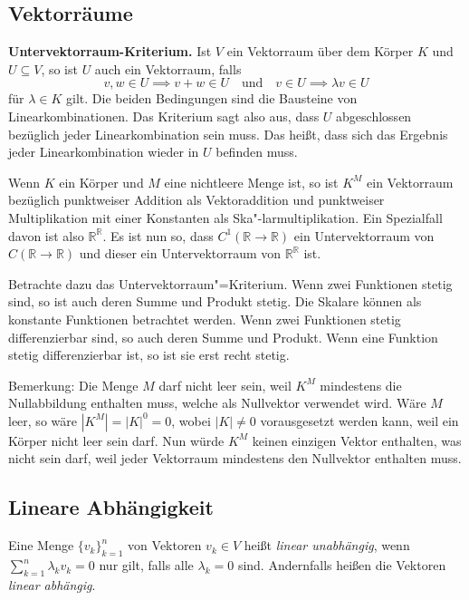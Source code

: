 \documentclass[a4paper,11pt,fleqn,twoside]{scrartcl}
\numberwithin{equation}{section}
\newcommand{\R}{\mathbb R}
\newcommand{\strong}[1]{{\sf\bfseries #1}}
\newenvironment{Definition}{\strong{Definition.}}{\par}
\begin{document}
\subsection{Vektorräume}
\strong{Untervektorraum-Kriterium.}
Ist $V$ ein Vektorraum über
dem Körper $K$ und $U\subseteq V$, so ist $U$ auch ein Vektorraum,
falls
\begin{equation}
v,w\in U\implies v+w\in U
\quad\text{und}\quad
v\in U\implies \lambda v\in U
\end{equation}
für $\lambda\in K$ gilt. Die beiden Bedingungen sind die Bausteine von
Linearkombinationen. Das Kriterium sagt also aus, dass $U$
abgeschlossen bezüglich jeder Linearkombination sein muss.
Das heißt, dass sich das Ergebnis jeder Linearkombination wieder
in $U$ befinden muss.

Wenn $K$ ein Körper und
$M$ eine nichtleere Menge ist, so ist $K^M$ ein Vektorraum bezüglich
punktweiser Addition als Vektoraddition und punktweiser Multiplikation
mit einer Konstanten als Ska"-larmultiplikation. Ein Spezialfall davon
ist also $\R^\R$. Es ist nun so, dass $C^1(\R\to\R)$ ein Untervektorraum
von $C(\R\to\R)$ und dieser ein Untervektorraum von $\R^\R$ ist.

Betrachte dazu das Untervektorraum"=Kriterium. Wenn zwei Funktionen
stetig sind, so ist auch deren Summe und Produkt stetig. Die Skalare
können als konstante Funktionen betrachtet werden. Wenn zwei
Funktionen stetig differenzierbar sind, so auch deren Summe und
Produkt. Wenn eine Funktion stetig differenzierbar ist, so ist sie
erst recht stetig.

Bemerkung: Die Menge $M$ darf nicht leer sein, weil $K^M$ mindestens
die Nullabbildung enthalten muss, welche als Nullvektor verwendet
wird. Wäre $M$ leer, so wäre $|K^M|=|K|^0=0$, wobei $|K|\ne 0$
vorausgesetzt werden kann, weil ein Körper nicht leer sein darf.
Nun würde $K^M$ keinen einzigen Vektor enthalten, was nicht sein darf,
weil jeder Vektorraum mindestens den Nullvektor enthalten muss.

\subsection{Lineare Abhängigkeit}
\begin{Definition}
Eine Menge $\{v_k\}_{k=1}^n$ von Vektoren $v_k\in V$ heißt
\emph{linear unabhängig}, wenn $\sum_{k=1}^n \lambda_k v_k=0$ nur
gilt, falls alle $\lambda_k=0$ sind. Andernfalls heißen die Vektoren
\emph{linear abhängig}.
\end{Definition}
\end{document}
